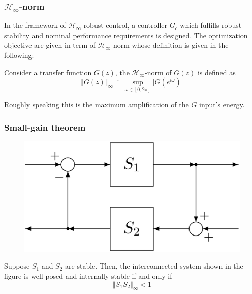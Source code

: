 \subsubsection{$\mathcal{H}_\infty$-norm}
In the framework of $\mathcal{H}_\infty$ robust control, a controller $G_c$ which fulfills robust stability and nominal performance requirements is designed. The optimization objective are given in term of $\mathcal{H}_\infty$-norm whose definition is given in the following: 
\begin{definition}
    Consider a transfer function $G(z)$, the $\mathcal{H}_\infty$-norm of $G(z)$ is defined as
    \begin{equation}
        \Vert G(z) \Vert_\infty \doteq \sup_{\omega\in[0,2\pi]} {\vert G(e^{i\omega})} \vert
    \end{equation}
\end{definition}
\noindent
Roughly speaking this is the maximum amplification of the $G$ input's energy.

\subsubsection{Small-gain theorem}

\begin{multicols}{2}
    \begin{figure}[H]
        \centering
        \includegraphics[scale=0.12]{img/small_gain.png}
    \end{figure}
    
    \begin{theorem}
        Suppose $S_1$ and $S_2$ are stable. Then, the interconnected system shown in the figure is well-posed and internally stable if and only if 
        \begin{equation}
            \Vert S_1 S_2 \Vert_\infty < 1
        \end{equation}
 \end{theorem}
    
\end{multicols}

